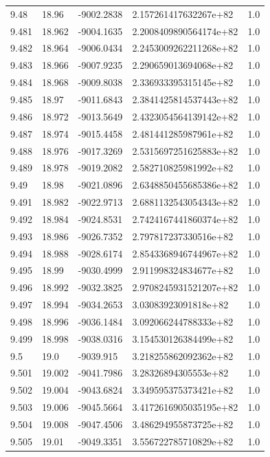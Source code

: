 \begin{tabular}{lllll}
9.48 & 18.96 & -9002.2838 & 2.157261417632267e+82 & 1.0 \\
9.481 & 18.962 & -9004.1635 & 2.2008409890564174e+82 & 1.0 \\
9.482 & 18.964 & -9006.0434 & 2.2453009262211268e+82 & 1.0 \\
9.483 & 18.966 & -9007.9235 & 2.290659013694068e+82 & 1.0 \\
9.484 & 18.968 & -9009.8038 & 2.336933395315145e+82 & 1.0 \\
9.485 & 18.97 & -9011.6843 & 2.3841425814537443e+82 & 1.0 \\
9.486 & 18.972 & -9013.5649 & 2.4323054564139142e+82 & 1.0 \\
9.487 & 18.974 & -9015.4458 & 2.481441285987961e+82 & 1.0 \\
9.488 & 18.976 & -9017.3269 & 2.5315697251625883e+82 & 1.0 \\
9.489 & 18.978 & -9019.2082 & 2.582710825981992e+82 & 1.0 \\
9.49 & 18.98 & -9021.0896 & 2.6348850455685386e+82 & 1.0 \\
9.491 & 18.982 & -9022.9713 & 2.6881132543054343e+82 & 1.0 \\
9.492 & 18.984 & -9024.8531 & 2.7424167441860374e+82 & 1.0 \\
9.493 & 18.986 & -9026.7352 & 2.797817237330516e+82 & 1.0 \\
9.494 & 18.988 & -9028.6174 & 2.8543368946744967e+82 & 1.0 \\
9.495 & 18.99 & -9030.4999 & 2.911998324834677e+82 & 1.0 \\
9.496 & 18.992 & -9032.3825 & 2.9708245931521207e+82 & 1.0 \\
9.497 & 18.994 & -9034.2653 & 3.03083923091818e+82 & 1.0 \\
9.498 & 18.996 & -9036.1484 & 3.092066244788333e+82 & 1.0 \\
9.499 & 18.998 & -9038.0316 & 3.154530126384499e+82 & 1.0 \\
9.5 & 19.0 & -9039.915 & 3.218255862092362e+82 & 1.0 \\
9.501 & 19.002 & -9041.7986 & 3.28326894305553e+82 & 1.0 \\
9.502 & 19.004 & -9043.6824 & 3.349595375373421e+82 & 1.0 \\
9.503 & 19.006 & -9045.5664 & 3.4172616905035195e+82 & 1.0 \\
9.504 & 19.008 & -9047.4506 & 3.486294955873725e+82 & 1.0 \\
9.505 & 19.01 & -9049.3351 & 3.556722785710829e+82 & 1.0 \\

\end{tabular}
